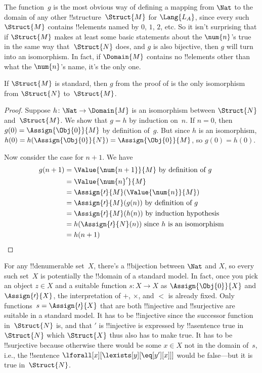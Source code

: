 \documentclass[../../../include/open-logic-section]{subfiles}
\begin{document}
\begin{explain}
The function~$g$ is the most obvious way of defining a mapping from
$\Nat$ to the domain of any other !!{structure}~$\Struct{M}$ for
$\Lang{L_A}$, since every such $\Struct{M}$ contains !!{element}s named
by $\num{0}$, $\num{1}$, $\num{2}$, etc. So it isn't surprising that
if $\Struct{M}$ makes at least some basic statements about the
$\num{n}$'s true in the same way that~$\Struct{N}$ does, and $g$ is
also bijective, then $g$ will turn into an isomorphism.  In fact, if
$\Domain{M}$ contains no !!{element}s other than what the $\num{n}$'s
name, it's the only one.
\end{explain}

\begin{prop}
 If $\Struct{M}$ is standard, then $g$ from
the proof of  is the only isomorphism from $\Struct{N}$ to~$\Struct{M}$.
\end{prop}

\begin{proof}
Suppose $h\colon \Nat \to \Domain{M}$ is an isomorphism between
$\Struct{N}$ and~$\Struct{M}$. We show that $g = h$ by induction
on~$n$. If $n = 0$, then $g(0) = \Assign{\Obj{0}}{M}$ by definition
of~$g$. But since $h$ is an isomorphism, $h(0) =
h(\Assign{\Obj{0}}{N}) =\Assign{\Obj{0}}{M}$, so $g(0) = h(0)$.

Now consider the case for $n+1$. We have
\begin{align*}
  g(n+1) & = \Value{\num{n+1}}{M} \text{ by definition of~$g$}\\
  & = \Value{\num{n}'}{M}\\
  & = \Assign{\prime}{M}(\Value{\num{n}}{M}) \\
  & = \Assign{\prime}{M}(g(n))  \text{ by definition of~$g$}\\
  & = \Assign{\prime}{M}(h(n)) \text{ by induction hypothesis}\\
  & = h(\Assign{\prime}{N}(n)) \text{ since $h$ is an isomorphism}\\
  & = h(n+1)
\end{align*}
\end{proof}

\begin{explain}
For any !!{denumerable} set~$X$, there's a !!{bijection} between
$\Nat$ and $X$, so every such set~$X$ is potentially the !!{domain} of
a standard model. In fact, once you pick an object $z \in X$ and a
suitable function $s\colon X \to X$ as $\Assign{\Obj{0}}{X}$ and
$\Assign{\prime}{X}$, the interpretation of $+$, $\times$, and $<$ is
already fixed.  Only functions~$s = \Assign{\prime}{X}$ that are both
!!{injective} and !!{surjective} are suitable in a standard model.  It
has to be !!{injective} since the successor function in~$\Struct{N}$
is, and that $\prime$ is !!{injective} is expressed by !!a{sentence}
true in $\Struct{N}$ which $\Struct{X}$ thus also has to make true. It
has to be !!{surjective} because otherwise there would be some $x \in
X$ not in the domain of~$s$, i.e., the !!{sentence}
$\lforall[x][\lexists[y][\eq[y'][x]]]$ would be false---but it is true
in~$\Struct{N}$.
\end{explain}
\end{document}
